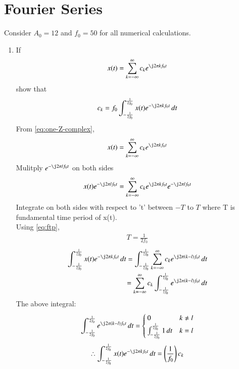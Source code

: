 \documentclass[journal,12pt,twocolumn]{IEEEtran}
\renewcommand\thesection{\arabic{section}}
\begin{document}
\section{Fourier Series}
Consider $A_0 =12$ and $f_0 = 50$ for all numerical calculations.
\begin{enumerate}[label=\thesection.\arabic*,ref=\thesection.\theenumi]
\item If
\begin{align}
	x(t) = \sum_{k = -\infty}^{\infty}c_ke^{\j2\pi kf_0 t}
\label{eq:one-Z-complex}
\end{align}
show that 
\begin{align}
	c_k = f_0\int_{-\frac{1}{2f_0}}^{\frac{1}{2f_0}}x(t)e^{-\j2\pi kf_0 t}\, dt
\label{eq:one-Z}
\end{align}
\solution 
    From \eqref{eq:one-Z-complex},
    \begin{align}
            x(t) = \sum_{k = -\infty}^{\infty}c_ke^{\j2\pi kf_0 t}
    \end{align}
    Mulitply $e^{-\j2\pi lf_0 t}$ on both sides
    \begin{align}
    x(t)e^{-\j2\pi lf_0 t}=\sum_{k = -\infty}^{\infty}c_ke^{\j2\pi kf_0 t}e^{-\j2\pi lf_0 t}
    \end{align}
    Integrate on both sides with respect to 't' between $-T$ to $T$ where T is fundamental time period of x(t).\\
    Using \eqref{eq:ftp},
    \begin{align}
    T=\frac{1}{2f_0}
    \end{align}
    \begin{align}
    \int_{-\frac{1}{2f_0}}^{\frac{1}{2f_0}}x(t)e^{-\j2\pi kf_0 t}\, dt=\int_{-\frac{1}{2f_0}}^{\frac{1}{2f_0}}\sum_{k = -\infty}^{\infty}c_ke^{\j2\pi \brak{k-l}f_0 t}\,dt\\
    =\sum_{k = -\infty}^{\infty}c_k\int_{-\frac{1}{2f_0}}^{\frac{1}{2f_0}}e^{\j2\pi \brak{k-l}f_0 t}\,dt
    \end{align}
    The above integral:
    \begin{align}
    \int_{-\frac{1}{2f_0}}^{\frac{1}{2f_0}}e^{\j2\pi \brak{k-l}f_0 t}\,dt=
          \begin{cases}
0 & k\neq l
\\
 \int_{-\frac{1}{2f_0}}^{\frac{1}{2f_0}}1\,dt& k=l
\end{cases}
    \end{align}
    \begin{align}
   \therefore \int_{-\frac{1}{2f_0}}^{\frac{1}{2f_0}}x(t)e^{-\j2\pi kf_0 t}\, dt &=\brak{\frac{1}{f_0}}c_k\\

\end{align}
\end{enumerate}
\end{document}
